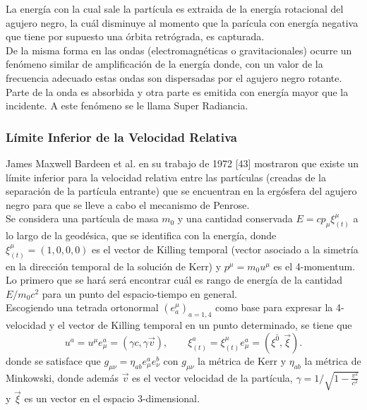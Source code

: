La energ\'ia con la cual sale la part\'icula es extraida de la energ\'ia rotacional del agujero negro, la cu\'al disminuye al momento que la par\'icula con energ\'ia negativa que tiene por supuesto una \'orbita retr\'ograda, es capturada.\\

De la misma forma en las ondas (electromagn\'eticas o gravitacionales) ocurre un fen\'omeno similar de amplificaci\'on de la energ\'ia donde, con un valor de la frecuencia adecuado estas ondas son dispersadas por el agujero negro rotante. Parte de la onda es absorbida y otra parte es emitida con energ\'ia mayor que la incidente. A este fen\'omeno se le llama Super Radiancia.\\

\subsubsection{L\'imite Inferior de la Velocidad Relativa}

James Maxwell Bardeen et al. en su trabajo de 1972 [43] mostraron que existe un l\'imite inferior para la velocidad relativa entre las part\'iculas (creadas de la separaci\'on de la part\'icula entrante) que se encuentran en la erg\'osfera del agujero negro para que se lleve a cabo el mecanismo de Penrose.\\

Se considera una part\'icula de masa $m_0$ y una cantidad conservada $E=cp_{\mu}\xi_{(t)}^{\mu}$ a lo largo de la geod\'esica, que se identifica con la energ\'ia, donde $\xi_{(t)}^{\mu}=(1,0,0,0)$ es el vector de Killing temporal (vector asociado a la simetr\'ia en la direcci\'on temporal de la soluci\'on de Kerr) y $p^{\mu}=m_0 u^{\mu}$ es el 4-momentum. Lo primero que se har\'a ser\'a encontrar cu\'al es rango de energ\'ia de la cantidad $E/m_0c^2$ para un punto del espacio-tiempo en general.\\

Escogiendo una tetrada ortonormal $\left(e^{\mu}_a\right)_{a=1,4}$ como base  para expresar la 4-velocidad y el vector de Killing temporal en un punto determinado, se tiene que
\begin{equation}\label{uyxi}
u^a=u^{\mu}e^a_{\mu}=(\gamma c, \gamma \vec{v}), \qquad \xi^a_{(t)}=\xi^{\mu}_{(t)}e^a_{\mu}=\left(\xi^{\hat{0}},\vec{\xi} \right).
\end{equation}
donde se satisface que $g_{\mu \nu}=\eta_{ab}e^a_{\mu}e^b_{\nu}$ con $g_{\mu \nu}$ la m\'etrica de Kerr y $\eta_{ab}$ la m\'etrica de Minkowski, donde adem\'as $\vec{v}$ es el vector velocidad de la part\'icula, $\gamma=1/\sqrt{1-\frac{v^2}{c^2}}$ y $\vec{\xi}$ es un vector en el espacio 3-dimensional.\\

